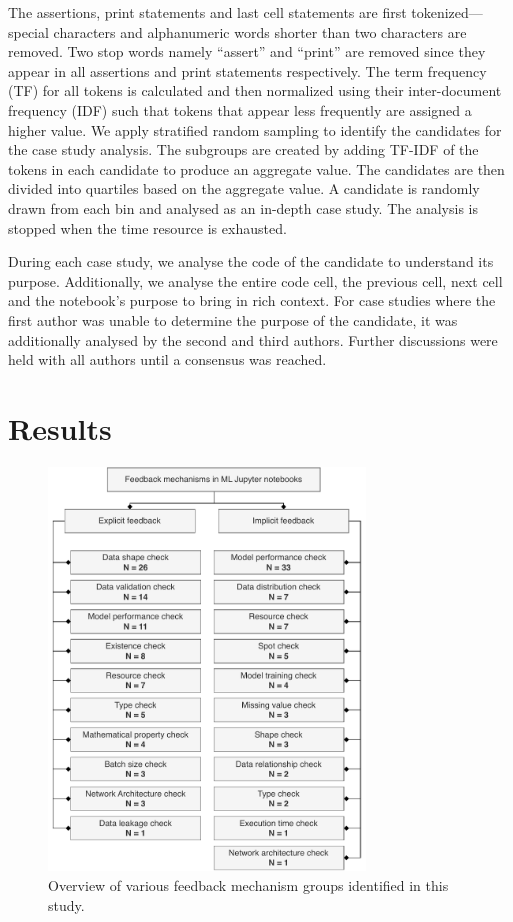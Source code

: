 \documentclass[smallextended]{svjour3}       %
\begin{document}
The assertions, print statements and last cell statements are first tokenized---special characters and alphanumeric words shorter than two characters are removed. Two stop words namely ``assert'' and ``print'' are removed since they appear in all assertions and print statements respectively. The term frequency (TF) for all tokens is calculated and then normalized using their inter-document frequency (IDF) such that tokens that appear less frequently are assigned a higher value. We apply stratified random sampling to identify the candidates for the case study analysis. The subgroups are created by adding TF-IDF of the tokens in each candidate to produce an aggregate value. The candidates are then divided into quartiles based on the aggregate value. A candidate is randomly drawn from each bin and analysed as an in-depth case study. The analysis is stopped when the time resource is exhausted.

During each case study, we analyse the code of the candidate to understand its purpose. Additionally, we analyse the entire code cell, the previous cell, next cell and the notebook's purpose to bring in rich context. For case studies where the first author was unable to determine the purpose of the candidate, it was additionally analysed by the second and third authors. Further discussions were held with all authors until a consensus was reached.

\section{Results}

\begin{figure}
  \centering
  \includegraphics[width=0.75\textwidth]{taxonomy.pdf}
  \caption{Overview of various feedback mechanism groups identified in this study.}
  \label{fig:taxonomy}
\end{figure}
\end{document}

